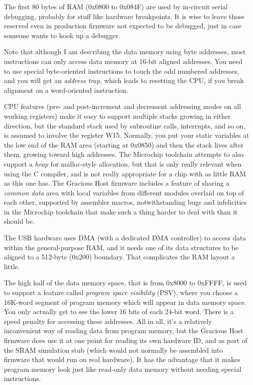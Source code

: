 The first 80 bytes of RAM (0x0800 to 0x084F) are used by in-circuit serial
debugging, probably for stuff like hardware breakpoints.  It is wise to
leave those reserved even in production firmware not expected to be
debugged, just in case someone wants to hook up a debugger.

Note that although I am describing the data memory using byte addresses,
most instructions can only access data memory at 16-bit aligned addresses. 
You need to use special byte-oriented instructions to touch the odd numbered
addresses, and you will get an \emph{address trap}, which leads to resetting
the CPU, if you break alignment on a word-oriented instruction.

CPU features (pre- and post-increment and decrement addressing modes on all
working registers) make it easy to support multiple stacks growing in either
direction, but the standard stack used by subroutine calls, interrupts, and
so on, is assumed to involve the register W15.  Normally, you put your
static variables at the low end of the RAM area (starting at 0x0850) and
then the stack lives after them, growing toward high addresses.  The
Microchip toolchain attempts to also support a \emph{heap} for malloc-style
allocation, but that is only really relevant when using the C compiler, and
is not really appropriate for a chip with as little RAM as this one has. 
The Gracious Host firmware includes a feature of sharing a \emph{common
data} area with local variables from different modules overlaid on top of
each other, supported by assembler macros, notwithstanding bugs and
infelicities in the Microchip toolchain that make such a thing harder to
deal with than it should be.

The USB hardware uses DMA (with a dedicated DMA controller) to access data
within the general-purpose RAM, and it needs one of its data structures to
be aligned to a 512-byte (0x200) boundary.  That complicates the RAM layout
a little.

The high half of the data memory space, that is from 0x8000 to 0xFFFF, is
used to support a feature called \emph{program space visibility} (PSV),
where you choose a 16K-word segment of program memory which will appear in
data memory space.  You only actually get to see the lower 16 bits of each
24-bit word.  There is a speed penalty for accessing these addresses.  All
in all, it's a relatively inconvenient way of reading data from program
memory, but the Gracious Host firmware does use it at one point for reading
its own hardware ID, and as part of the SRAM simulation stub (which would
not normally be assembled into firmware that would run on real hardware). 
It has the advantage that it makes program memory look just like read-only
data memory without needing special instructions.

